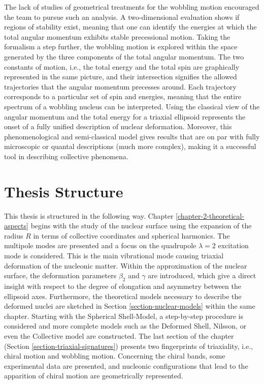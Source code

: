 The lack of studies of geometrical treatments for the wobbling motion encouraged the team to pursue such an analysis. A two-dimensional evaluation shows if regions of stability exist, meaning that one can identify the energies at which the total angular momentum exhibits stable precessional motion. Taking the formalism a step further, the wobbling motion is explored within the space generated by the three components of the total angular momentum. The two constants of motion, i.e., the total energy and the total spin are graphically represented in the same picture, and their intersection signifies the allowed trajectories that the angular momentum precesses around. Each trajectory corresponds to a particular set of spin and energies, meaning that the entire spectrum of a wobbling nucleus can be interpreted. Using the classical view of the angular momentum and the total energy for a triaxial ellipsoid represents the onset of a fully unified description of nuclear deformation. Moreover, this phenomenological and semi-classical model gives results that are on par with fully microscopic or quantal descriptions (much more complex), making it a successful tool in describing collective phenomena.

\section{Thesis Structure}

This thesis is structured in the following way. Chapter \ref{chapter-2-theoretical-aspects} begins with the study of the nuclear surface using the expansion of the radius $R$ in terms of collective coordinates and spherical harmonics. The multipole modes are presented and a focus on the quadrupole $\lambda=2$ excitation mode is considered. This is the main vibrational mode causing triaxial deformation of the nucleonic matter. Within the approximation of the nuclear surface, the deformation parameters $\beta_2$ and $\gamma$ are introduced, which give a direct insight with respect to the degree of elongation and asymmetry between the ellipsoid axes. Furthermore, the theoretical models necessary to describe the deformed nuclei are sketched in Section \ref{section-nuclear-models} within the same chapter. Starting with the Spherical Shell-Model, a step-by-step procedure is considered and more complete models such as the Deformed Shell, Nilsson, or even the Collective model are constructed. The last section of the chapter (Section \ref{section-triaxial-signatures}) presents two fingerprints of triaxiality, i.e., chiral motion and wobbling motion. Concerning the chiral bands, some experimental data are presented, and nucleonic configurations that lead to the apparition of chiral motion are geometrically represented. 

